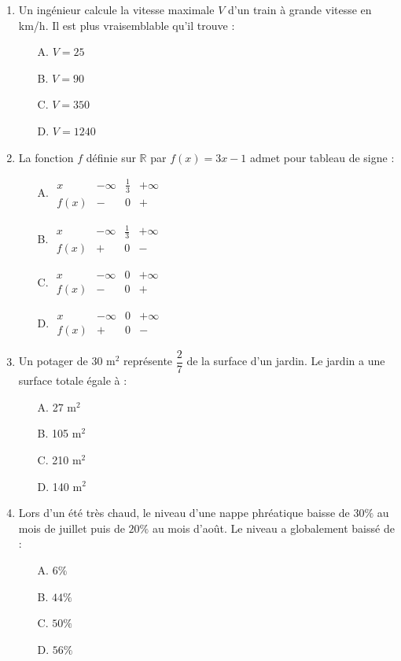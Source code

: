 \documentclass[a4paper,12pt]{article}
\begin{document}
\begin{enumerate}
\item Un ingénieur calcule la vitesse maximale $V$ d'un train à grande vitesse en km/h. Il est plus vraisemblable qu'il trouve :
\begin{itemize}
\item[A.] $V = 25$
\item[B.] $V = 90$
\item[C.] $V = 350$
\item[D.] $V = 1240$
\end{itemize}

\item La fonction $f$ définie sur $\mathbb{R}$ par $f(x) = 3x - 1$ admet pour tableau de signe :
\begin{itemize}
\item[A.] 
$\begin{array}{c|ccc}
x & -\infty & \frac{1}{3} & +\infty \\ \hline
f(x) & - & 0 & +
\end{array}$
\item[B.]
$\begin{array}{c|ccc}
x & -\infty & \frac{1}{3} & +\infty \\ \hline
f(x) & + & 0 & -
\end{array}$
\item[C.]
$\begin{array}{c|ccc}
x & -\infty & 0 & +\infty \\ \hline
f(x) & - & 0 & +
\end{array}$
\item[D.]
$\begin{array}{c|ccc}
x & -\infty & 0 & +\infty \\ \hline
f(x) & + & 0 & -
\end{array}$
\end{itemize}

\item Un potager de 30 m$^2$ représente $\dfrac{2}{7}$ de la surface d'un jardin. Le jardin a une surface totale égale à :
\begin{itemize}
\item[A.] 27 m$^2$
\item[B.] 105 m$^2$
\item[C.] 210 m$^2$
\item[D.] 140 m$^2$
\end{itemize}

\item Lors d'un été très chaud, le niveau d'une nappe phréatique baisse de $30\%$ au mois de juillet puis de $20\%$ au mois d'août. Le niveau a globalement baissé de :
\begin{itemize}
\item[A.] $6\%$
\item[B.] $44\%$
\item[C.] $50\%$
\item[D.] $56\%$
\end{itemize}


\end{enumerate}
\end{document}
